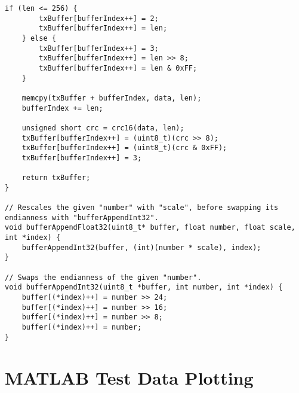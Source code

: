 \begin{lstlisting}[escapeinside=``]
    if (len <= 256) {
        txBuffer[bufferIndex++] = 2;
        txBuffer[bufferIndex++] = len;
    } else {
        txBuffer[bufferIndex++] = 3;
        txBuffer[bufferIndex++] = len >> 8;
        txBuffer[bufferIndex++] = len & 0xFF;
    }

    memcpy(txBuffer + bufferIndex, data, len);
    bufferIndex += len;

    unsigned short crc = crc16(data, len);
    txBuffer[bufferIndex++] = (uint8_t)(crc >> 8);
    txBuffer[bufferIndex++] = (uint8_t)(crc & 0xFF);
    txBuffer[bufferIndex++] = 3;

    return txBuffer;
}

// Rescales the given "number" with "scale", before swapping its endianness with "bufferAppendInt32".
void bufferAppendFloat32(uint8_t* buffer, float number, float scale, int *index) {
    bufferAppendInt32(buffer, (int)(number * scale), index);
}

// Swaps the endianness of the given "number".
void bufferAppendInt32(uint8_t *buffer, int number, int *index) {
    buffer[(*index)++] = number >> 24;
    buffer[(*index)++] = number >> 16;
    buffer[(*index)++] = number >> 8;
    buffer[(*index)++] = number;
}
\end{lstlisting}

\newpage

\section{MATLAB Test Data Plotting} \label{code:plotting}

\lstset{
    language=Matlab,
}

